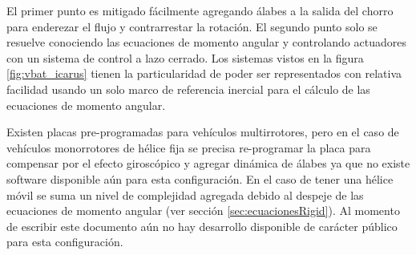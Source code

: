 El primer punto es mitigado fácilmente agregando álabes a la salida del chorro para enderezar el flujo y contrarrestar la rotación. El segundo punto solo se resuelve conociendo las ecuaciones de momento angular y controlando actuadores con un sistema de control a lazo cerrado. Los sistemas vistos en la figura \ref{fig:vbat_icarus} tienen la particularidad de poder ser representados con relativa facilidad usando un solo marco de referencia inercial para el cálculo de las ecuaciones de momento angular.

Existen placas pre-programadas para vehículos multirrotores, pero en el caso de vehículos monorrotores de hélice fija se precisa re-programar la placa para compensar por el efecto giroscópico y agregar dinámica de álabes ya que no existe software disponible aún para esta configuración. En el caso de tener una hélice móvil se suma un nivel de complejidad agregada debido al despeje de las ecuaciones de momento angular (ver sección \ref{sec:ecuacionesRigid}). Al momento de escribir este documento aún no hay desarrollo disponible de carácter público para esta configuración.